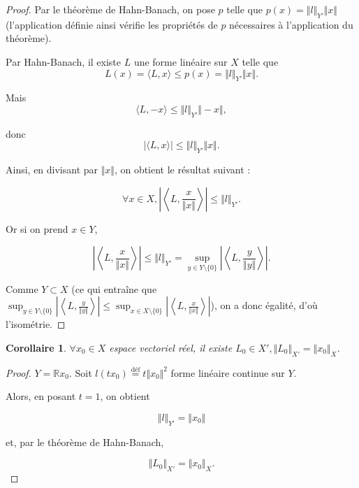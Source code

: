 \documentclass[french]{book}
\newtheorem*{corollary}{Corollaire}
\begin{document}
\begin{proof}
  Par le théorème de Hahn-Banach, on pose $p$ telle que $p(x) = \Vert l \Vert _{Y'} \Vert x \Vert  $ (l'application définie ainsi vérifie les propriétés de $p$ nécessaires à l'application du théorème).

  Par Hahn-Banach, il existe $L$ une forme linéaire sur $X$ telle que
  \[
  L(x)  = \langle L,x \rangle \leq p(x) = \Vert l \Vert _{Y'} \Vert x \Vert.
  \]

  Mais
  \[
  \langle L, -x \rangle \leq \Vert l \Vert _{Y'} \Vert -x \Vert,
  \]

  donc
  \[
  \lvert \langle L,x \rangle  \rvert \leq \Vert l \Vert _{Y'} \Vert x \Vert.
  \]

  Ainsi, en divisant par $\Vert x \Vert $, on obtient le résultat suivant :

  \[
  \forall x \in X, \left\lvert \left\langle L, \frac{x}{\Vert x \Vert } \right\rangle  \right\rvert \leq \Vert l \Vert _{Y'}.
  \]

  Or si on prend $x \in Y$,

  \[
  \left\lvert \left\langle L, \frac{x}{\Vert x \Vert } \right\rangle  \right\rvert \leq \Vert l \Vert _{Y'} = \sup_{ y \in Y \setminus \{ 0 \} } \left\lvert \left\langle L, \frac{y}{\Vert y \Vert } \right\rangle  \right\rvert.
  \]

  Comme $Y \subset X$ (ce qui entraîne que $\sup_{ y \in Y \setminus \{ 0 \} } \left\lvert \left\langle L, \frac{y}{\Vert y \Vert } \right\rangle   \right\rvert \leq \sup_{ x \in X \setminus \{ 0 \} } \left\lvert \left\langle L, \frac{x}{\Vert x \Vert } \right\rangle   \right\rvert  $), on a donc égalité, d'où l'isométrie.
\end{proof}

\begin{corollary}
  $\forall x_0 \in X$ espace vectoriel réel, il existe $L_0 \in X', \Vert L_0 \Vert _{X'} = \Vert x_0 \Vert _{X} $.
\end{corollary}

\begin{proof}
  $Y = \mathbb{R} x_0$. Soit $l(tx_0) \stackrel{\text{déf}}{=} t \Vert x_0 \Vert ^2 $ forme linéaire continue sur $Y$.

  Alors, en posant $t=1$, on obtient

  \[
  \Vert l \Vert _{Y'} =  \Vert x_0 \Vert
  \]


  et, par le théorème de Hahn-Banach,

  \[
  \Vert L_0 \Vert _{X'} = \Vert x_0 \Vert _{X}.
  \]
\end{proof}
\end{document}
